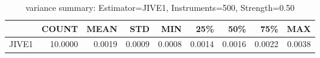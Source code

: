 \begin{table}[ht]
\centering
\caption{variance summary: Estimator=JIVE1, Instruments=500, Strength=0.50}
\begin{tabular}{lrrrrrrrr}
\toprule
 & COUNT & MEAN & STD & MIN & 25\% & 50\% & 75\% & MAX \\
\midrule
JIVE1 & 10.0000 & 0.0019 & 0.0009 & 0.0008 & 0.0014 & 0.0016 & 0.0022 & 0.0038 \\
\bottomrule
\end{tabular}
\end{table}
